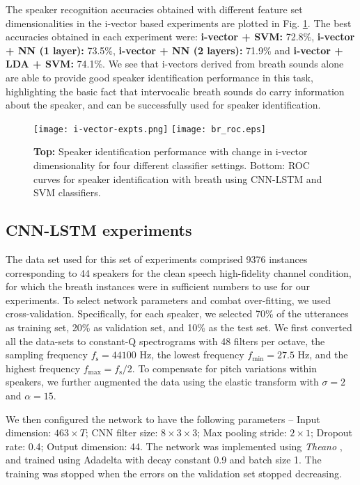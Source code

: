 \documentclass[a4paper]{article}
\begin{document}
The speaker recognition accuracies obtained with different feature set dimensionalities in the i-vector based experiments are plotted in Fig. \ref{fig:ivectors}. The best accuracies obtained in each experiment were: \textbf{i-vector + SVM:} 72.8\%, \textbf{i-vector + NN (1 layer):} 73.5\%, \textbf{i-vector + NN (2 layers):} 71.9\% and \textbf{i-vector + LDA + SVM:} 74.1\%. We see that i-vectors derived from breath sounds alone are able to provide good speaker identification performance in this task, highlighting the basic fact that intervocalic breath sounds do carry information about the speaker, and can be successfully used for speaker identification.

\begin{figure}[!ht]
\begin{minipage}[b]{0.9\linewidth}
\centering
\texttt{[image: i-vector-expts.png]} \hfill
\texttt{[image: br\_roc.eps]}
\end{minipage}\hfill
\caption {\textbf{Top:} Speaker identification performance with change in i-vector dimensionality for four different classifier settings. Bottom: ROC curves for speaker identification with breath using CNN-LSTM and SVM classifiers.}
\label{fig:ivectors}
\vspace{-0.5cm}
\end{figure}

\subsection{CNN-LSTM experiments}
The data set used for this set of experiments comprised 9376 instances corresponding to 44 speakers for the clean speech high-fidelity channel condition, for which the breath instances were in sufficient numbers to use for our experiments. To select network parameters and combat over-fitting, we used cross-validation. Specifically, for each speaker, we selected 70\% of the utterances as training set, 20\% as validation set, and 10\% as the test set. 
We first converted all the data-sets to constant-Q spectrograms  \cite{brown1991calculation} with 48 filters per octave, the sampling frequency $f_{\mathrm{s}}=44100$ Hz, the lowest frequency  $f_{\mathrm{min}} = 27.5$ Hz, and the highest frequency $f_{\mathrm{max}}=f_{\mathrm{s}}/2$. To compensate for pitch variations within speakers, we further augmented the data using the elastic transform  \cite{simard2003best} with $\sigma=2$ and $\alpha=15$. 

We then configured the network to have the following parameters -- Input dimension: $463\times T$; CNN filter size: $8\times 3 \times 3$; Max pooling stride: $2\times 1$; Dropout rate: 0.4; Output dimension: 44. The network was implemented using \textit{Theano}  \cite{2016arXiv160502688short}, and trained using Adadelta  \cite{zeiler2012adadelta} with decay constant 0.9 and batch size 1. The training was stopped when the errors on the validation set stopped decreasing.
\end{document}

